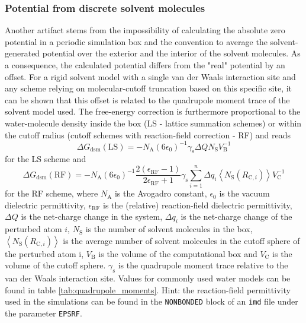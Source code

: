 \subsubsection{Potential from discrete solvent molecules}
Another artifact stems from the impossibility of calculating the
absolute zero potential in a periodic simulation box and the
convention to average the solvent-generated potential over the
exterior and the interior of the solvent molecules. As a consequence,
the calculated potential differs from the "real" potential by an
offset. For a rigid solvent model with a single van der Waals
interaction site and any scheme relying on molecular-cutoff truncation
based on this specific site, it can be shown that this offset is
related to the quadrupole moment trace of the solvent model used. The
free-energy correction is furthermore proportional to the
water-molecule density inside the box (LS - lattice summation schemes)
or within the cutoff radius (cutoff schemes with reaction-field
correction - RF) and reads
\begin{equation}
  \Delta G_{\text{dsm}}(\text{LS}) = -N_{\text{A}} (6 \epsilon_0)^{-1} \gamma_{\text{s}} \Delta Q N_{\text{S}} V_{\text{B}}^{-1}
\end{equation}
for the LS scheme and
\begin{equation} \label{equ:dsm}
  \Delta G_{\text{dsm}}(\text{RF}) = -N_{\text{A}} (6 \epsilon_0)^{-1} \frac{2 (\epsilon_{\text{RF}}-1)}{2\epsilon_{\text{RF}}+1} \gamma_{\text{s}} \sum_{i=1}^n \Delta q_i \left\langle N_{\text{S}}(R_{\text{C},i})\right\rangle V_{\text{C}}^{-1}
\end{equation}
for the RF scheme, where $N_{\text{A}}$ is the Avogadro constant, $\epsilon_0$
is the vacuum dielectric permittivity, $\epsilon_{\text{RF}}$ is the (relative)
reaction-field dielectric permittivity, $\Delta Q$ is the net-charge
change in the system, $\Delta q_i$ is the net-charge change of the perturbed atom $i$, $N_{\text{S}}$ is the number of solvent molecules in the
box, $\left\langle N_{\text{S}}(R_{\text{C},i})\right\rangle$ is the average number of
solvent molecules in the cutoff sphere of the perturbed atom i, $V_{\text{B}}$ is the volume of the
computational box and $V_{\text{C}}$ is the volume of the cutoff
sphere. $\gamma_{\text{s}}$ is the quadrupole moment trace relative to the van
der Waals interaction site. Values for commonly used water models can be found in
table \ref{tab:quadrupole_moments}. Hint: the reaction-field permittivity used in the simulations can be found in the \texttt{NONBONDED} block of an \texttt{imd} file under the parameter \texttt{EPSRF}.

